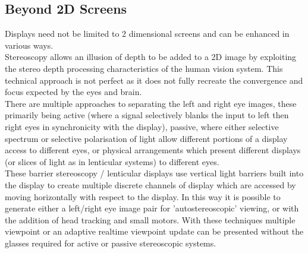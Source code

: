 \subsection{Beyond 2D Screens}
            Displays need not be limited to 2 dimensional screens and can be enhanced in various ways.\\
                Stereoscopy allows an illusion of depth to be added to a 2D image by exploiting the stereo depth processing characteristics of the human vision system. This technical approach is not perfect as it does not fully recreate the convergence and focus expected by the eyes and brain.\\ %
                There are multiple approaches to separating the left and right eye images, these primarily being active (where a signal selectively blanks the input to left then right eyes in synchronicity with the display), passive, where either selective spectrum or selective polarisation of light allow different portions of a display access to different eyes, or physical arrangements which present different displays (or slices of light as in lenticular systems) to different eyes.\\
                These barrier stereoscopy / lenticular displays use vertical light barriers built into the display to create multiple discrete channels of display which are accessed by moving horizontally with respect to the display. In this way it is possible to generate either a left/right eye image pair for 'autostereoscopic' viewing, or with the addition of head tracking and small motors. With these techniques multiple viewpoint or an adaptive realtime viewpoint update can be presented without the glasses required for active or passive stereoscopic systems. \\

